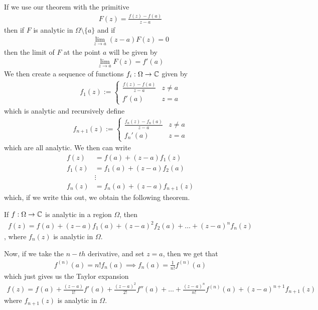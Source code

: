 If we use our theorem with the primitive
\begin{align*}
	F(z) = \frac{f(z) - f(a)}{z-a}
\end{align*}
then if $F$ is analytic in $\Omega \setminus \{a\}$ and if
\begin{align*}
	\lim_{z \to a}(z-a)F(z) = 0
\end{align*}
then the limit of $F$ at the point $a$ will be given by
\begin{align*}
	\lim_{z \to a}F(z) = f'(a)
\end{align*}
We then create a sequence of functions $f_i: \Omega \to \mathbb{C}$ given by
\begin{align*}
	f_1(z) := \left\{\begin{array}{ll}
			\frac{f(z) - f(a)}{z-a} & z \neq a\\
			f'(a) & z = a
	\end{array} \right.
\end{align*}
which is analytic and recursively define
\begin{align*}
	f_{n+1}(z) := \left\{\begin{array}{ll}
			\frac{f_n(z) - f_n(a)}{z-a} & z \neq a \\
			f_n'(a) & z = a
	\end{array} \right.
\end{align*}
which are all analytic. We then can write
\begin{align*}
	f(z) &= f(a) + (z-a)f_1(z)\\
	f_1(z) &= f_1(a) + (z-a)f_2(a)\\
				 &\vdots\\
	f_n(z) &= f_n(a) + (z-a) f_{n+1}(z)
\end{align*}
which, if we write this out, we obtain the following theorem.
\begin{theorem}[]
	If $f: \Omega \to \mathbb{C}$ is analytic in a region $\Omega$, then
	\begin{align*}
		f(z) = f(a) + (z-a)f_1(a) + (z-a)^2 f_2(a) + \ldots + (z-a)^{n} f_n(z)
	\end{align*}
	, where $f_n(z)$ is analytic in $\Omega$.
\end{theorem}

Now, if we take the $n-th$ derivative, and set $z = a$, then we get that
\begin{align*}
	f^{(n)}(a) = n!f_n(a) \implies f_n(a) = \frac{1}{n!}f^{(n)}(a)
\end{align*}
which just gives us the Taylor expansion 
\begin{align*}
	f(z) = f(a) + \frac{(z-a)}{1!} f'(a) + \frac{(z-a)^2}{2!}f''(a) + \ldots + \frac{(z-a)^n}{n!}f^{(n)}(a) + (z-a)^{n+1}f_{n+1}(z)
\end{align*}
where $f_{n+1}(z)$ is analytic in $\Omega$. 

